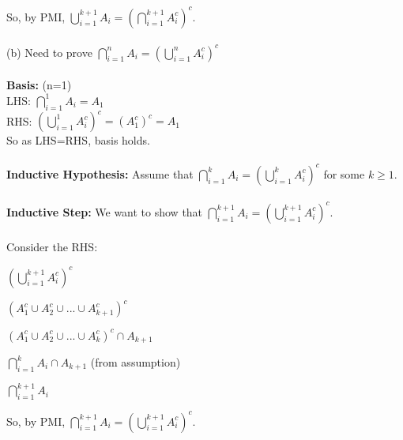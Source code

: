 \documentclass[a4paper]{article}
\begin{document}
\begin{enumerate}
    So, by PMI, $\bigcup_{i=1}^{k+1} A_i = \left(\bigcap_{i=1}^{k+1} A_i^c\right)^c$.\\
    \\
    (b) Need to prove $\bigcap_{i=1}^{n} A_i = \left(\bigcup_{i=1}^{n} A_i^c\right)^c$\\
    \\
    \textbf{Basis:} (n=1)\\
    LHS: $\bigcap_{i=1}^{1} A_i = A_1$\\
    RHS: $\left(\bigcup_{i=1}^{1} A_i^c\right)^c = (A_1^c)^c = A_1$\\
    So as LHS=RHS, basis holds.\\
    \\
    \textbf{Inductive Hypothesis:} Assume that $\bigcap_{i=1}^{k} A_i = \left(\bigcup_{i=1}^{k} A_i^c\right)^c$ for some $k \geq 1$.\\
    \\
    \textbf{Inductive Step:} We want to show that $\bigcap_{i=1}^{k+1} A_i = \left(\bigcup_{i=1}^{k+1} A_i^c\right)^c$.\\
    \\
    Consider the RHS:
    \begin{sollist}
        \item $\left(\bigcup_{i=1}^{k+1} A_i^c\right)^c$
        \item $\left(A_1^c \cup A_2^c \cup ... \cup A_{k+1}^c\right)^c$
        \item $\left(A_1^c \cup A_2^c \cup ... \cup A_k^c \right)^c \cap A_{k+1}$
        \item $\bigcap_{i=1}^{k} A_i \cap A_{k+1}$ (from assumption)
        \item $\bigcap_{i=1}^{k+1} A_i$
    \end{sollist}
    
    So, by PMI, $\bigcap_{i=1}^{k+1} A_i = \left(\bigcup_{i=1}^{k+1} A_i^c\right)^c$.\\


\end{enumerate}
\end{document}
